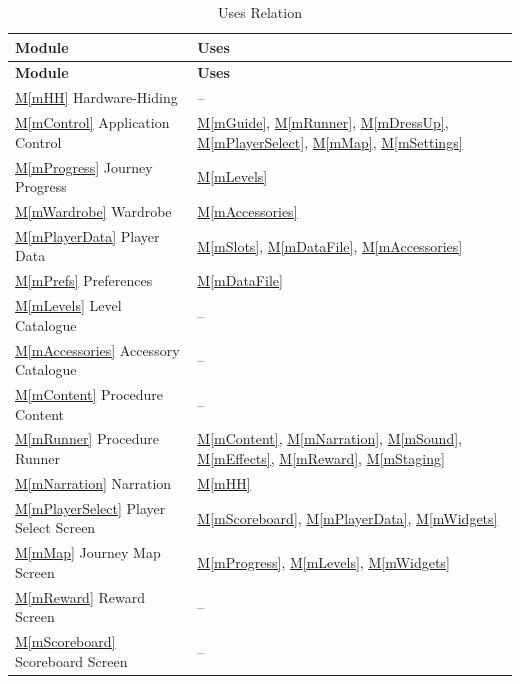 \documentclass[10pt, titlepage]{article}
\newcommand{\mref}[1]{\texorpdfstring{\hyperref[md:#1]{M\ref*{#1}}}{M\ref*{#1}}}
\begin{document}
\begin{longtable}{p{} p{}}
\caption{Uses Relation}\label{TblUses}\\
\toprule
\textbf{Module} & \textbf{Uses}\\
\midrule
\endfirsthead
\toprule
\textbf{Module} & \textbf{Uses}\\
\midrule
\endhead

\mref{mHH} Hardware-Hiding & --\\

\mref{mControl} Application Control &
\mref{mGuide}, \mref{mRunner}, \mref{mDressUp},
\mref{mPlayerSelect}, \mref{mMap}, \mref{mSettings}\\

\mref{mProgress} Journey Progress &
\mref{mLevels}\\

\mref{mWardrobe} Wardrobe &
\mref{mAccessories}\\

\mref{mPlayerData} Player Data &
\mref{mSlots}, \mref{mDataFile}, \mref{mAccessories}\\

\mref{mPrefs} Preferences &
\mref{mDataFile}\\

\mref{mLevels} Level Catalogue & --\\

\mref{mAccessories} Accessory Catalogue & --\\

\mref{mContent} Procedure Content & --\\

\mref{mRunner} Procedure Runner &
\mref{mContent}, \mref{mNarration}, \mref{mSound},
\mref{mEffects}, \mref{mReward}, \mref{mStaging}\\

\mref{mNarration} Narration &
\mref{mHH}\\

\mref{mPlayerSelect} Player Select Screen &
\mref{mScoreboard}, \mref{mPlayerData}, \mref{mWidgets}\\

\mref{mMap} Journey Map Screen &
\mref{mProgress}, \mref{mLevels}, \mref{mWidgets}\\

\mref{mReward} Reward Screen & --\\

\mref{mScoreboard} Scoreboard Screen & --\\


\end{longtable}
\end{document}
